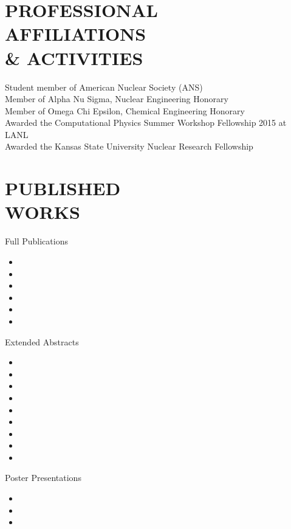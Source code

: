 \documentclass[margin, 10pt]{res} %
\begin{document}
\begin{resume}
\section{PROFESSIONAL \\ AFFILIATIONS  \\ \& ACTIVITIES}

Student member of American Nuclear Society (ANS) \\
Member of Alpha Nu Sigma, Nuclear Engineering Honorary \\
Member of Omega Chi Epsilon, Chemical Engineering Honorary\\
Awarded the Computational Physics Summer Workshop Fellowship 2015 at LANL\\
Awarded the Kansas State University Nuclear Research Fellowship

\section{PUBLISHED \\ WORKS}
Full Publications
\begin{itemize}
\item {}
\item {}
\item {}
\item {}
\item {}
\item {}
\end{itemize}
Extended Abstracts
\begin{itemize}
\item {}
\item {}
\item {}
\item {}
\item {}
\item {}
\item {}
\item {}
\item {}
\end{itemize}
Poster Presentations
\begin{itemize}
\item {}
\item {}
\item {}
\end{itemize}

\end{resume}
\end{document}
